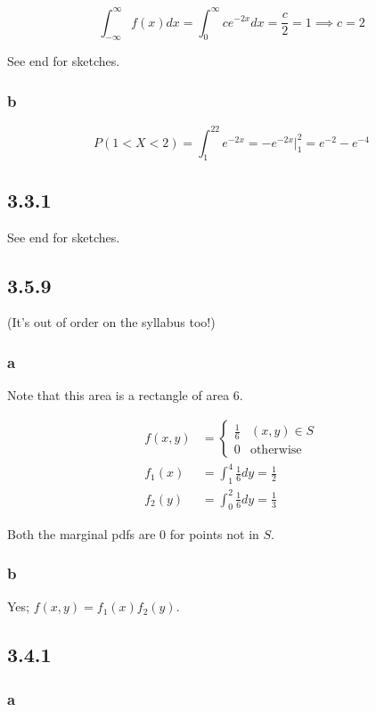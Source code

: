 \documentclass[12pt,letterpaper]{article}
\theoremstyle{definition}
\begin{document}
\[
  \int_{-\infty}^\infty f(x)dx = \int_0^\infty ce^{-2x}dx = \frac{c}{2} = 1 \implies c = 2
\]

See end for sketches.

\subsubsection*{b}

\[
  P(1 < X < 2) = \int_1^22e^{-2x} = -e^{-2x}\Big|^2_1 = e^{-2} - e^{-4}
\]

\subsection*{3.3.1}

See end for sketches.

\subsection*{3.5.9}

(It's out of order on the syllabus too!)

\subsubsection*{a}

Note that this area is a rectangle of area 6.

\begin{align*}
  f(x, y) &= \begin{cases}
    \frac{1}{6} & (x,y) \in S \\
    0 & \text{otherwise}
  \end{cases} \\
  f_1(x) &= \int_1^4\frac{1}{6}dy = \frac{1}{2} \\
  f_2(y) &= \int_0^2\frac{1}{6}dy = \frac{1}{3}
\end{align*}

Both the marginal pdfs are 0 for points not in $S$.

\subsubsection*{b}

Yes; $f(x,y) = f_1(x)f_2(y)$.

\subsection*{3.4.1}

\subsubsection*{a}
\end{document}
